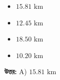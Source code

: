 \documentclass[12pt, a4paper]{article}
\begin{document}
\begin{itemize}[label={}, leftmargin=1cm, itemsep=0.5em]
    \item[\textbf{A)}]  $15.81\text{ km}$
    \item[\textbf{B)}]  $12.45\text{ km}$
    \item[\textbf{C)}] $18.50\text{ km}$
    \item[\textbf{D)}]  $10.20\text{ km}$
\end{itemize}

\vspace{0.5em}
\begin{tcolorbox}[answerbox]
    \textbf{\color{success} উত্তর:} A) $15.81\text{ km}$
\end{tcolorbox}
\vspace{1em}
\end{document}
